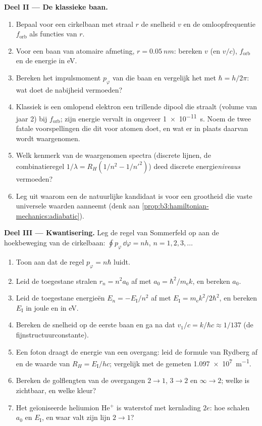 \begin{problem}
\medskip\noindent\textbf{Deel II --- De klassieke baan.}
\begin{enumerate}[resume]
  \item Bepaal voor een cirkelbaan met straal $r$ de snelheid $v$ en de
        omloopfrequentie $f_{\text{orb}}$ als functies van $r$.
  \item Voor een baan van atomaire afmeting, $r = \qty{0.05}{nm}$:
        bereken $v$ (en $v/c$), $f_{\text{orb}}$ en de energie in eV.
  \item Bereken het impulsmoment $p_\varphi$ van die baan en vergelijk
        het met $\hbar = h/2\pi$: wat doet de nabijheid vermoeden?
  \item Klassiek is een omlopend elektron een trillende dipool die
        straalt (volume van jaar 2) bij $f_{\text{orb}}$; zijn energie
        vervalt in ongeveer \qty{1e-11}{s}. Noem de twee fatale
        voorspellingen die dit voor atomen doet, en wat er in plaats
        daarvan wordt waargenomen.
  \item Welk kenmerk van de waargenomen spectra (discrete lijnen, de
        combinatieregel $1/\lambda = R_H(1/n^2 - 1/n'^2)$) deed
        discrete energie\emph{niveaus} vermoeden?
  \item Leg uit waarom een \emph{} de natuurlijke
        kandidaat is voor een grootheid die vaste universele waarden
        aanneemt (denk aan
        \cref{prop:b3:hamiltonian-mechanics:adiabatic}).
\end{enumerate}

\medskip\noindent\textbf{Deel III --- Kwantisering.}
Leg de regel van Sommerfeld op aan de hoekbeweging van de cirkelbaan:
$\oint p_\varphi\,\dd\varphi = nh$, $n = 1, 2, 3, \dots$
\begin{enumerate}[resume]
  \item Toon aan dat de regel $p_\varphi = n\hbar$ luidt.
  \item Leid de toegestane stralen $r_n = n^2a_0$ af met $a_0 =
        \hbar^2/m_{\text{e}}k$, en bereken $a_0$.
  \item Leid de toegestane energieën $E_n = -E_{\text{I}}/n^2$ af met
        $E_{\text{I}} = m_{\text{e}}k^2/2\hbar^2$, en bereken
        $E_{\text{I}}$ in joule en in eV.
  \item Bereken de snelheid op de eerste baan en ga na dat $v_1/c =
        k/\hbar c \approx 1/137$ (de fijnstructuurconstante).
  \item Een foton draagt de energie van een overgang: leid de formule
        van Rydberg af en de waarde van $R_H = E_{\text{I}}/hc$;
        vergelijk met de gemeten \qty{1.097e7}{m^{-1}}.
  \item Bereken de golflengten van de overgangen $2 \to 1$,
        $3 \to 2$ en $\infty \to 2$; welke is zichtbaar, en welke
        kleur?
  \item Het geïoniseerde heliumion He$^+$ is waterstof met kernlading
        $2e$: hoe schalen $a_0$ en $E_{\text{I}}$, en waar valt zijn
        lijn $2 \to 1$?
\end{enumerate}


\end{problem}
